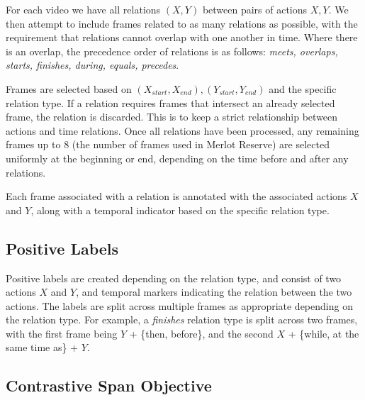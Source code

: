 For each video we have all relations $(X, Y)$ between pairs of actions $X, Y$.
We then attempt to include frames related to as many relations as possible,
with the requirement that relations cannot overlap with one another in time.
Where there is an overlap, the precedence order of relations is as follows: \textit{meets,
overlaps, starts, finishes, during, equals, precedes}. %

Frames are selected based on $(X_{start}, X_{end}), (Y_{start}, Y_{end})$ and
the specific relation type. If a relation requires frames that intersect an
already selected frame, the relation is discarded. This is to keep a strict
relationship between actions and time relations. Once all relations have been
processed, any remaining frames up to 8 (the number of frames used in Merlot
Reserve) are selected uniformly at the beginning or end, depending on the time
before and after any relations. %

Each frame associated with a relation is annotated with the associated actions
$X$ and $Y$, along with a temporal indicator based on the specific relation
type. 


\subsection{Positive Labels}
\label{ssec:pos_labels}

Positive labels are created depending on the relation type, and consist of two
actions $X$ and $Y$, and temporal markers indicating the relation between the
two actions. The labels are split across multiple frames as appropriate
depending on the relation type. For example, a \textit{finishes} relation type
is split across two frames, with the first frame being $Y$ + \{then, before\},
and the second $X$ + \{while, at the same time as\} + $Y$. 

\subsection{Contrastive Span Objective}
\label{ssec:contr_span}

